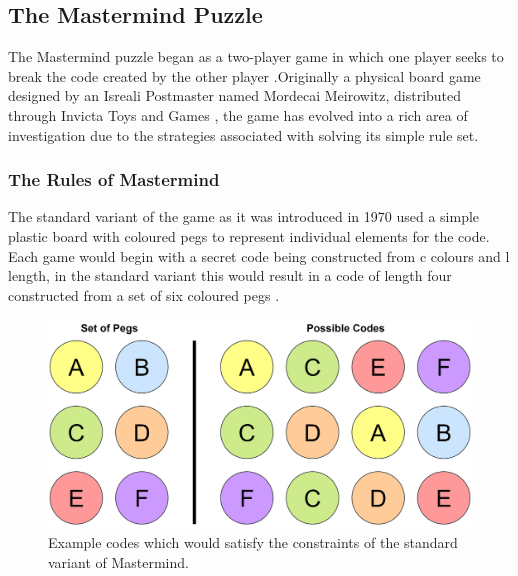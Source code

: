 \documentclass[12pt]{article}  %
\theoremstyle{definition}
\theoremstyle{remark}
\begin{document}
\subsection {The Mastermind Puzzle}

The Mastermind puzzle began as a two-player game in which one player seeks to break the code created by the other player \cite{Wolfram}.Originally a physical board game designed by an Isreali Postmaster named Mordecai Meirowitz, distributed through Invicta Toys and Games \cite{Invicta}, the game has evolved into a rich area of investigation due to the strategies
associated with solving its simple rule set.

\subsubsection {The Rules of Mastermind}

The standard variant of the game as it was introduced in 1970 used a simple plastic board with coloured pegs to represent individual elements for the code.
Each game would begin with a secret code being constructed from c colours and l length, in the standard variant this would result in a code of length four constructed from a set
of six coloured pegs \cite{Wolfram}.

\begin{figure}[H]
\centering
\includegraphics[scale=0.5]{pegs}
\caption{ Example codes which would satisfy the constraints of the standard variant of Mastermind.}
\end{figure}
\end{document}
